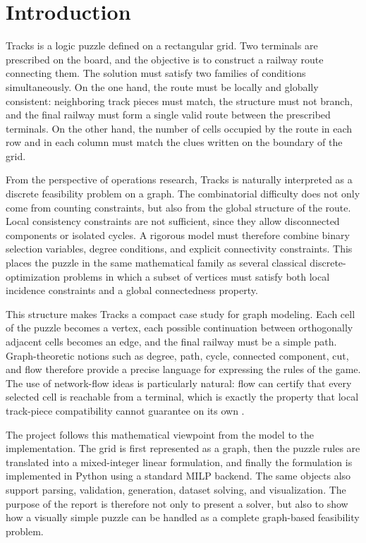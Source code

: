 \section{Introduction}

Tracks is a logic puzzle defined on a rectangular grid. Two terminals are
prescribed on the board, and the objective is to construct a railway route
connecting them. The solution must satisfy two families of conditions
simultaneously. On the one hand, the route must be locally and globally
consistent: neighboring track pieces must match, the structure must not branch,
and the final railway must form a single valid route between the prescribed
terminals. On the other hand, the number of cells occupied by the route in each
row and in each column must match the clues written on the boundary of the
grid.

From the perspective of operations research, Tracks is naturally interpreted
as a discrete feasibility problem on a graph. The combinatorial difficulty does
not only come from counting constraints, but also from the global structure of
the route. Local consistency constraints are not sufficient, since they allow
disconnected components or isolated cycles. A rigorous model must therefore
combine binary selection variables, degree conditions, and explicit
connectivity constraints. This places the puzzle in the same mathematical
family as several classical discrete-optimization problems in which a subset
of vertices must satisfy both local incidence constraints and a global
connectedness property.

This structure makes Tracks a compact case study for graph modeling. Each cell
of the puzzle becomes a vertex, each possible continuation between
orthogonally adjacent cells becomes an edge, and the final railway must be a
simple path. Graph-theoretic notions such as degree, path, cycle, connected
component, cut, and flow therefore provide a precise language for expressing
the rules of the game. The use of network-flow ideas is particularly natural:
flow can certify that every selected cell is reachable from a terminal, which
is exactly the property that local track-piece compatibility cannot guarantee
on its own \cite{ahuja1993,validi2022,miyazawa2021}.

The project follows this mathematical viewpoint from the model to the
implementation. The grid is first represented as a graph, then the puzzle
rules are translated into a mixed-integer linear formulation, and finally the
formulation is implemented in Python using a standard MILP backend. The same
objects also support parsing, validation, generation, dataset solving, and
visualization. The purpose of the report is therefore not only to present a
solver, but also to show how a visually simple puzzle can be handled as a
complete graph-based feasibility problem.
